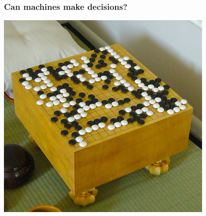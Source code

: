 \documentclass{beamer}
\begin{document}

\begin{frame}
  \frametitle{Can machines make decisions?}
  \begin{center}
    \includegraphics[width=0.8\textwidth]{../figures/619px-FloorGoban}
  \end{center}
\end{frame}

\end{document}
